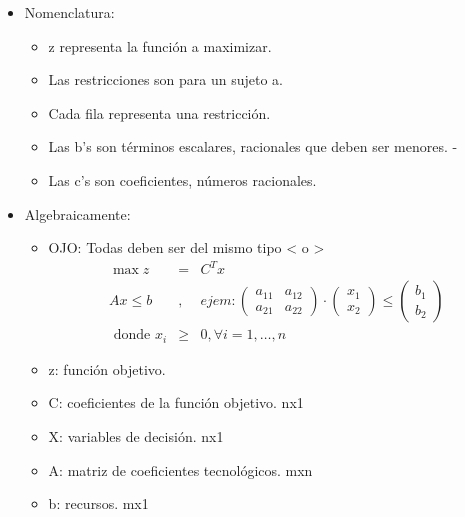 \documentclass[12pt, twoside, openright]{report} %
\begin{document}
    \begin{itemize}
  
    \item
      Nomenclatura:

      \begin{itemize}
    
      \item
        z representa la función a maximizar.
      \item
        Las restricciones son para un sujeto a.
      \item
        Cada fila representa una restricción.
		\item Las b's son términos escalares, racionales que deben ser menores. -
		\item Las c's son coeficientes, números racionales.
      \end{itemize}
    \end{itemize}    

    \begin{itemize}
  
    \item
      Algebraicamente:

      \begin{itemize}
      \item
        OJO: Todas deben ser del mismo tipo \textless{} o \textgreater{}
		\begin{eqnarray*} 
			\max z &=& C^{T}x \\  
			Ax\leq b&,& ejem: \begin{pmatrix}  a_{11} & a_{12} \\  
			a_{21} & a_{22}  \end{pmatrix} \cdot \begin{pmatrix}  x_1\\  
			x_2  \end{pmatrix} \leq \begin{pmatrix}  b_1\\  
			b_2  \end{pmatrix}\\  
			\text { donde } x_{i} &\geq& 0, \forall i=1, \ldots, n
		\end{eqnarray*}
      \item
        z: función objetivo.
      \item
        C: coeficientes de la función objetivo. nx1
      \item
        X: variables de decisión. nx1
      \item
        A: matriz de coeficientes tecnológicos. mxn
	  \item b: recursos. mx1
      \end{itemize}
    \end{itemize}
\end{document}
